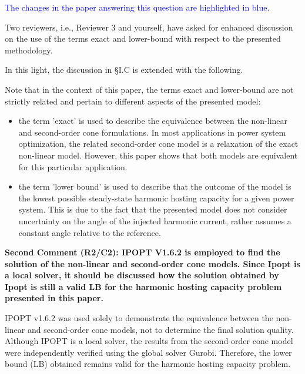 \documentclass[10pt]{article}
\begin{document}
\begin{tcolorbox}[colback=black!5!white,colframe=black]

\textcolor{blue}{The changes in the paper answering this question are highlighted in blue.} \newline 

Two reviewers, i.e., Reviewer 3 and yourself, have asked for enhanced discussion on the use of the terms exact and lower-bound with respect to the presented methodology. \newline

In this light, the discussion in \S I.C is extended with the following. \newline

Note that in the context of this paper, the terms exact and lower-bound are not strictly related and pertain to different aspects of the presented model:
\begin{itemize}
    \item the term 'exact' is used to describe the equivalence between the non-linear and second-order cone formulations. In most applications in power system optimization, the related second-order cone model is a relaxation of the exact non-linear model. However, this paper shows that both models are equivalent for this particular application.
    \item the term 'lower bound' is used to describe that the outcome of the model is the lowest possible steady-state harmonic hosting capacity for a given power system. This is due to the fact that the presented model does not consider uncertainty on the angle of the injected harmonic current, rather assumes a constant angle relative to the reference.
\end{itemize}

\end{tcolorbox}

\textbf{Second Comment (R2/C2): IPOPT V1.6.2 is employed to find the solution of the non-linear and second-order cone models. Since Ipopt is a local solver, it should be discussed how the solution obtained by Ipopt is still a valid LB for the harmonic hosting capacity problem presented in this paper.}

\begin{tcolorbox}[colback=black!5!white,colframe=black]

IPOPT v1.6.2 was used solely to demonstrate the equivalence between the non-linear and second-order cone models, not to determine the final solution quality. Although IPOPT is a local solver, the results from the second-order cone model were independently verified using the global solver Gurobi. Therefore, the lower bound (LB) obtained remains valid for the harmonic hosting capacity problem.

\end{tcolorbox}
\end{document}
